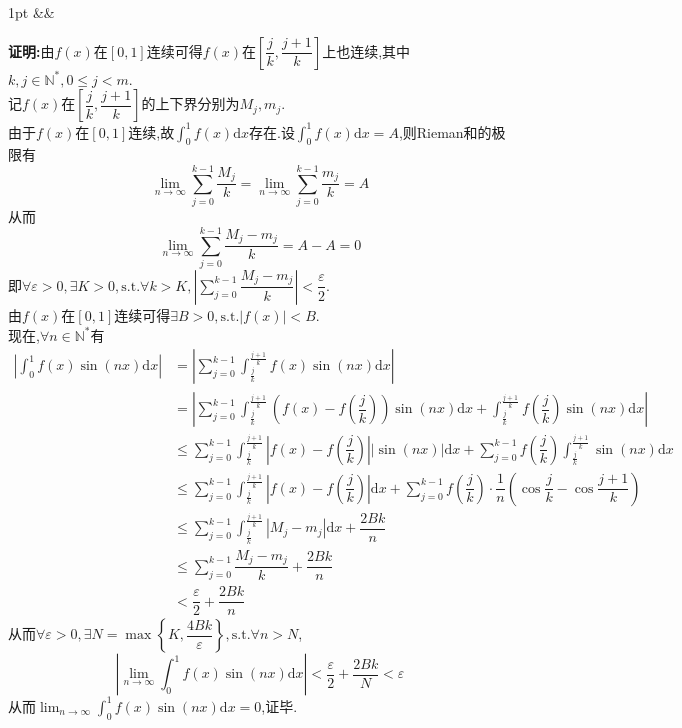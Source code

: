 \documentclass{ctexart}
\newcommand{\di}{\mathrm{d}}
\newcommand{\N}{\mathbb{N}}
\newcommand{\ep}{\varepsilon}
\newcommand{\st}{,\text{s.t.}}
\newcommand{\dx}{\di x}
\newenvironment{solution}[1][]{%
\def\FrameCommand{%
\hspace{1pt}%
{\color{solutionline}\vrule width 2pt}%
{\color{solutionshade}\vrule width 4pt}%
\colorbox{solutionshade}%
}%
\MakeFramed{\advance\hsize-\width\FrameRestore}%
\noindent\hspace{-4.55pt}%
\begin{adjustwidth}{}{1pt}%
\setlength{\parindent}{0pt}%
\vspace{3pt}%
\ifx&#1&\else %
    \textbf{#1}\par\vspace{1pt}%
\fi
}
{%
\vspace{2pt}%
\end{adjustwidth}\endMakeFramed%
}
\begin{document}
\begin{solution}
    \textbf{证明:}由$f(x)$在$[0,1]$连续可得$f(x)$在$\left[\dfrac{j}{k},\dfrac{j+1}{k}\right]$上也连续,其中$k,j\in\N^*,0\leqslant j<m$.\\
    记$f(x)$在$\left[\dfrac{j}{k},\dfrac{j+1}{k}\right]$的上下界分别为$M_j,m_j$.\\
    由于$f(x)$在$[0,1]$连续,故$\displaystyle\int_{0}^{1}{f(x)\dx}$存在.设$\displaystyle\int_{0}^{1}{f(x)\dx}=A$,则Rieman和的极限有
    $$\lim_{n\to\infty}{\sum_{j=0}^{k-1}{\dfrac{M_j}{k}}}=\lim_{n\to\infty}{\sum_{j=0}^{k-1}{\dfrac{m_j}{k}}}=A$$
    从而$$\lim_{n\to\infty}{\sum_{j=0}^{k-1}{\dfrac{M_j-m_j}{k}}}=A-A=0$$
    即$\displaystyle\forall\ep>0,\exists K>0\st\forall k>K,\left|\sum_{j=0}^{k-1}{\dfrac{M_j-m_j}{k}}\right|<\dfrac{\ep}{2}$.\\
    由$f(x)$在$[0,1]$连续可得$\exists B>0\st\left|f(x)\right|<B$.\\
    现在,$\forall n\in\N^*$有
    \begin{align*}
        \left|\int_{0}^{1}{f(x)\sin(nx)\dx}\right|
        &= \left|\sum_{j=0}^{k-1}{\int_{\frac{j}{k}}^{\frac{j+1}{k}}{f(x)\sin(nx)\dx}}\right| \\
        &= \left|\sum_{j=0}^{k-1}{\int_{\frac{j}{k}}^{\frac{j+1}{k}}{\left(f(x)-f\left(\dfrac{j}{k}\right)\right)\sin(nx)\dx}}+\int_{\frac{j}{k}}^{\frac{j+1}{k}}{f\left(\dfrac{j}{k}\right)\sin(nx)\dx}\right| \\
        &\leqslant \sum_{j=0}^{k-1}{\int_{\frac{j}{k}}^{\frac{j+1}{k}}{\left|f(x)-f\left(\dfrac{j}{k}\right)\right|\left|\sin(nx)\right|\dx}}+\sum_{j=0}^{k-1}{f\left(\dfrac{j}{k}\right)\int_{\frac{j}{k}}^{\frac{j+1}{k}}{\sin(nx)\dx}} \\
        &\leqslant \sum_{j=0}^{k-1}{\int_{\frac{j}{k}}^{\frac{j+1}{k}}{\left|f(x)-f\left(\dfrac{j}{k}\right)\right|\dx}}+\sum_{j=0}^{k-1}{f\left(\dfrac{j}{k}\right)\cdot\dfrac{1}{n}\left(\cos{\dfrac{j}{k}}-\cos{\dfrac{j+1}{k}}\right)} \\
        &\leqslant \sum_{j=0}^{k-1}{\int_{\frac{j}{k}}^{\frac{j+1}{k}}{\left|M_j-m_j\right|\dx}}+\dfrac{2Bk}{n} \\
        &\leqslant \sum_{j=0}^{k-1}{\dfrac{M_j-m_j}{k}}+\dfrac{2Bk}{n} \\
        &< \dfrac{\ep}{2}+\dfrac{2Bk}{n}
    \end{align*}
    从而$\forall\ep>0,\exists N=\max\left\{K,\dfrac{4Bk}{\ep}\right\}\st\forall n>N$,
    $$\left|\lim_{n\to\infty}{\int_{0}^{1}{f(x)\sin(nx)\dx}}\right|<\dfrac{\ep}{2}+\dfrac{2Bk}{N}<\ep$$
    从而$\displaystyle\lim_{n\to\infty}{\int_{0}^{1}{f(x)\sin(nx)\dx}}=0$,证毕.
\end{solution}
\end{document}
